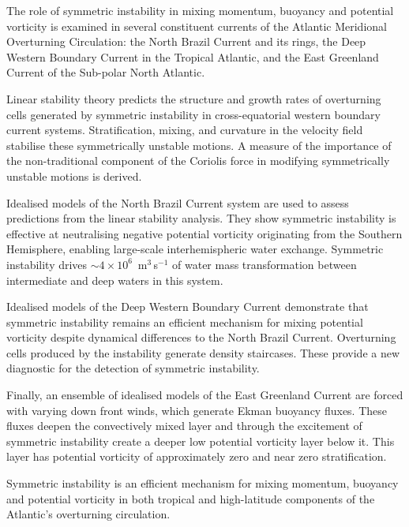 \cleardoublepage
{}
{}
\begin{abstractlong}
    \begin{spacing}{1.25}
    The role of symmetric instability in mixing momentum, buoyancy and potential vorticity is examined in several constituent currents of the Atlantic Meridional Overturning Circulation: the North Brazil Current and its rings, the Deep Western Boundary Current in the Tropical Atlantic, and the East Greenland Current of the Sub-polar North Atlantic.

    Linear stability theory predicts the structure and growth rates of overturning cells generated by symmetric instability in cross-equatorial western boundary current systems. Stratification, mixing, and curvature in the velocity field stabilise these symmetrically unstable motions. A measure of the importance of the non-traditional component of the Coriolis force in modifying symmetrically unstable motions is derived.

    Idealised models of the North Brazil Current system are used to assess predictions from the linear stability analysis. They show symmetric instability is effective at neutralising negative potential vorticity originating from the Southern Hemisphere, enabling large-scale interhemispheric water exchange. Symmetric instability drives $\sim 4 \times 10^6$~m$^3$\,s$^{-1}$ of water mass transformation between intermediate and deep waters in this system.

    Idealised models of the Deep Western Boundary Current demonstrate that symmetric instability remains an efficient mechanism for mixing potential vorticity despite dynamical differences to the North Brazil Current. Overturning cells produced by the instability generate density staircases. These provide a new diagnostic for the detection of symmetric instability.

    Finally, an ensemble of idealised models of the East Greenland Current are forced with varying down front winds, which generate Ekman buoyancy fluxes. These fluxes deepen the convectively mixed layer and through the excitement of symmetric instability create a deeper low potential vorticity layer below it. This layer has potential vorticity of approximately zero and near zero stratification.

    Symmetric instability is an efficient mechanism for mixing momentum, buoyancy and potential vorticity in both tropical and high-latitude components of the Atlantic's overturning circulation.
    \end{spacing}

\end{abstractlong}